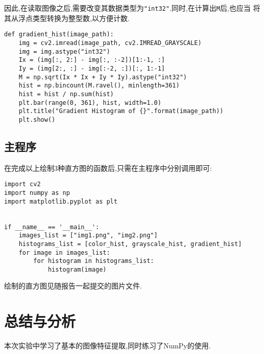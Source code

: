 \documentclass[a4paper]{article}
\begin{document}
因此,在读取图像之后,需要改变其数据类型为\texttt{"int32"}.同时,在计算出\texttt{M}后,也应当
将其从浮点类型转换为整型数,以方便计数.
\begin{verbatim}
def gradient_hist(image_path):
    img = cv2.imread(image_path, cv2.IMREAD_GRAYSCALE)
    img = img.astype("int32")
    Ix = (img[:, 2:] - img[:, :-2])[1:-1, :]
    Iy = (img[2:, :] - img[:-2, :])[:, 1:-1]
    M = np.sqrt(Ix * Ix + Iy * Iy).astype("int32")
    hist = np.bincount(M.ravel(), minlength=361)
    hist = hist / np.sum(hist)
    plt.bar(range(0, 361), hist, width=1.0)
    plt.title("Gradient Histogram of {}".format(image_path))
    plt.show()
\end{verbatim}
    \subsection{主程序}
在完成以上绘制3种直方图的函数后,只需在主程序中分别调用即可:
\begin{verbatim}
import cv2
import numpy as np
import matplotlib.pyplot as plt


if __name__ == '__main__':
    images_list = ["img1.png", "img2.png"]
    histograms_list = [color_hist, grayscale_hist, gradient_hist]
    for image in images_list:
        for histogram in histograms_list:
            histogram(image)
\end{verbatim}

绘制的直方图见随报告一起提交的图片文件.
    \newpage
    \section{总结与分析}
本次实验中学习了基本的图像特征提取,同时练习了NumPy的使用.
\end{document}
